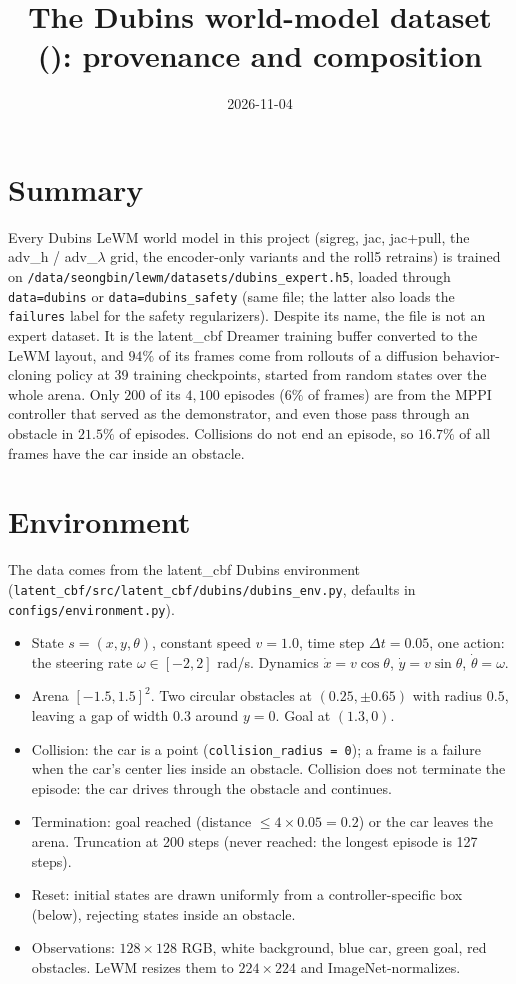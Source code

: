\documentclass[11pt]{article}
\title{The Dubins world-model dataset (\file{dubins_expert.h5}): provenance and composition}
\author{}
\date{2026-11-04}
\newcommand{\file}[1]{\nolinkurl{#1}}
\begin{document}
\maketitle

\section{Summary}

Every Dubins LeWM world model in this project (sigreg, jac, jac+pull, the adv\_h / adv\_$\lambda$ grid, the encoder-only variants and the roll5 retrains) is trained on \file{/data/seongbin/lewm/datasets/dubins_expert.h5}, loaded through \file{data=dubins} or \file{data=dubins_safety} (same file; the latter also loads the \file{failures} label for the safety regularizers). Despite its name, the file is not an expert dataset. It is the latent\_cbf Dreamer training buffer converted to the LeWM layout, and $94\%$ of its frames come from rollouts of a diffusion behavior-cloning policy at 39 training checkpoints, started from random states over the whole arena. Only $200$ of its $4{,}100$ episodes ($6\%$ of frames) are from the MPPI controller that served as the demonstrator, and even those pass through an obstacle in $21.5\%$ of episodes. Collisions do not end an episode, so $16.7\%$ of all frames have the car inside an obstacle.

\section{Environment}

The data comes from the latent\_cbf Dubins environment (\file{latent_cbf/src/latent_cbf/dubins/dubins_env.py}, defaults in \file{configs/environment.py}).

\begin{itemize}
\item State $s = (x, y, \theta)$, constant speed $v = 1.0$, time step $\Delta t = 0.05$, one action: the steering rate $\omega \in [-2, 2]$ rad/s. Dynamics $\dot x = v\cos\theta$, $\dot y = v\sin\theta$, $\dot\theta = \omega$.
\item Arena $[-1.5, 1.5]^2$. Two circular obstacles at $(0.25, \pm 0.65)$ with radius $0.5$, leaving a gap of width $0.3$ around $y = 0$. Goal at $(1.3, 0)$.
\item Collision: the car is a point (\file{collision_radius = 0}); a frame is a failure when the car's center lies inside an obstacle. Collision does not terminate the episode: the car drives through the obstacle and continues.
\item Termination: goal reached (distance $\le 4 \times 0.05 = 0.2$) or the car leaves the arena. Truncation at 200 steps (never reached: the longest episode is 127 steps).
\item Reset: initial states are drawn uniformly from a controller-specific box (below), rejecting states inside an obstacle.
\item Observations: $128 \times 128$ RGB, white background, blue car, green goal, red obstacles. LeWM resizes them to $224 \times 224$ and ImageNet-normalizes.
\end{itemize}
\end{document}
